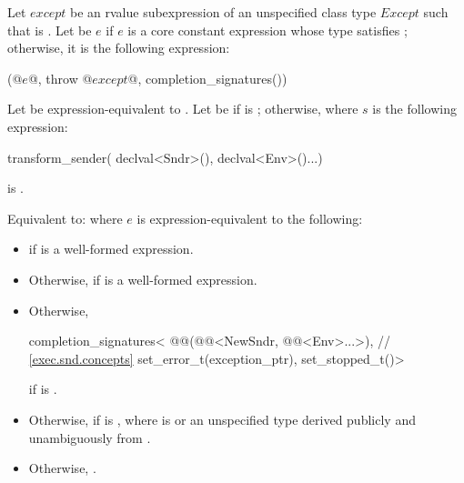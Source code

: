 \begin{itemdescr}
\pnum
Let $except$ be an rvalue subexpression of
an unspecified class type $Except$ such that
is .
Let  be $e$
if $e$ is a core constant expression whose
type satisfies ;
otherwise, it is the following expression:
\begin{codeblock}
(@$e$@, throw @$except$@, completion_signatures())
\end{codeblock}
Let 
be expression-equivalent to
.
Let  be 
if  is ;
otherwise, 
where $s$ is the following expression:
\begin{codeblock}
transform_sender(
  declval<Sndr>(),
  declval<Env>()...)
\end{codeblock}

\pnum
\constraints
{} is .

\pnum
\effects
Equivalent to: 
where $e$ is expression-equivalent to the following:
\begin{itemize}
\item
{}
if 
is a well-formed expression.

\item
Otherwise,
if 
is a well-formed expression.

\item
Otherwise,
\begin{codeblock}
completion_signatures<
  @@(@@<NewSndr, @@<Env>...>),   // \ref{exec.snd.concepts}
  set_error_t(exception_ptr),
  set_stopped_t()>
\end{codeblock}
if 
is .

\item
Otherwise,
if  is ,
where  is
 or
an unspecified type derived publicly and unambiguously from
.

\item
Otherwise,
.
\end{itemize}
\end{itemdescr}

